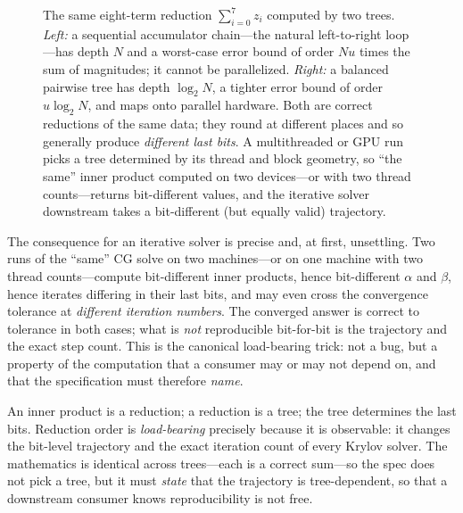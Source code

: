 \begin{figure}[t]
\caption[Two reduction trees over the same data]{The same eight-term reduction
$\sum_{i=0}^{7} z_i$ computed by two trees. \emph{Left:} a sequential accumulator
chain---the natural left-to-right loop---has depth $N$ and a worst-case error bound
of order $N u$ times the sum of magnitudes; it cannot be parallelized. \emph{Right:}
a balanced pairwise tree has depth $\log_2 N$, a tighter error bound of order
$u\log_2 N$, and maps onto parallel hardware. Both are correct reductions of the
same data; they round at different places and so generally produce \emph{different
last bits}. A multithreaded or GPU run picks a tree determined by its thread and
block geometry, so ``the same'' inner product computed on two devices---or with two
thread counts---returns bit-different values, and the iterative solver downstream
takes a bit-different (but equally valid) trajectory.}
\label{fig:redtree}
\end{figure}

The consequence for an iterative solver is precise and, at first, unsettling. Two
runs of the ``same'' CG solve on two machines---or on one machine with two thread
counts---compute bit-different inner products, hence bit-different $\alpha$ and
$\beta$, hence iterates differing in their last bits, and may even cross the
convergence tolerance at \emph{different iteration numbers}. The converged answer is
correct to tolerance in both cases; what is \emph{not} reproducible bit-for-bit is
the trajectory and the exact step count. This is the canonical load-bearing trick:
not a bug, but a property of the computation that a consumer may or may not depend
on, and that the specification must therefore \emph{name}.

\begin{keyidea}
An inner product is a reduction; a reduction is a tree; the tree determines the last
bits. Reduction order is \emph{load-bearing} precisely because it is observable: it
changes the bit-level trajectory and the exact iteration count of every Krylov
solver. The mathematics is identical across trees---each is a correct sum---so the
spec does not pick a tree, but it must \emph{state} that the trajectory is
tree-dependent, so that a downstream consumer knows reproducibility is not free.
\end{keyidea}

